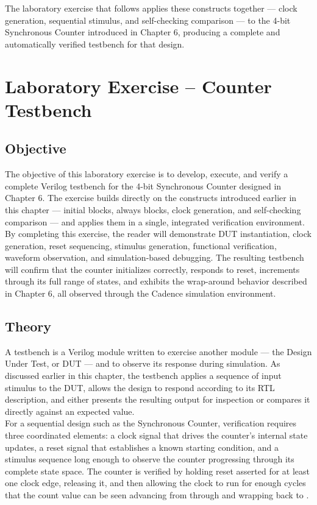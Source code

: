 \noindent The laboratory exercise that follows applies these constructs together — clock generation, sequential stimulus, and self-checking comparison — to the 4-bit Synchronous Counter introduced in Chapter 6, producing a complete and automatically verified testbench for that design.

\section{Laboratory Exercise -- Counter Testbench}

\subsection{Objective}
The objective of this laboratory exercise is to develop, execute, and verify a complete Verilog testbench for the 4-bit Synchronous Counter designed in Chapter 6. The exercise builds directly on the constructs introduced earlier in this chapter — initial blocks, always blocks, clock generation, and self-checking comparison — and applies them in a single, integrated verification environment.\\


\noindent By completing this exercise, the reader will demonstrate DUT instantiation, clock generation, reset sequencing, stimulus generation, functional verification, waveform observation, and simulation-based debugging. The resulting testbench will confirm that the counter initializes correctly, responds to reset, increments through its full range of states, and exhibits the wrap-around behavior described in Chapter 6, all observed through the Cadence simulation environment.

\subsection{Theory}
A testbench is a Verilog module written to exercise another module — the Design Under Test, or DUT — and to observe its response during simulation. As discussed earlier in this chapter, the testbench applies a sequence of input stimulus to the DUT, allows the design to respond according to its RTL description, and either presents the resulting output for inspection or compares it directly against an expected value.\\

\noindent For a sequential design such as the Synchronous Counter, verification requires three coordinated elements: a clock signal that drives the counter's internal state updates, a reset signal that establishes a known starting condition, and a stimulus sequence long enough to observe the counter progressing through its complete state space. The counter is verified by holding reset asserted for at least one clock edge, releasing it, and then allowing the clock to run for enough cycles that the count value can be seen advancing from  through  and wrapping back to .\\


